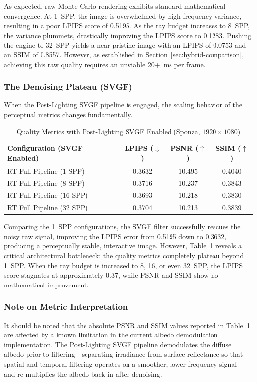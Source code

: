 \documentclass[12pt,a4paper]{report}
\begin{document}
As expected, raw Monte Carlo rendering exhibits standard mathematical convergence. At 1~SPP, the image is overwhelmed by high-frequency variance,
resulting in a poor LPIPS score of 0.5195. As the ray budget increases to 8~SPP, the variance plummets, drastically improving the LPIPS score to 0.1283. Pushing the engine to 32~SPP yields a near-pristine image with an LPIPS of 0.0753 and an SSIM of 0.8557.
However, as established in Section~\ref{sec:hybrid-comparison}, achieving this raw quality requires an unviable 20+~ms per frame.

\subsubsection{The Denoising Plateau (SVGF)}
\label{sec:denoising-plateau}
When the Post-Lighting SVGF pipeline is engaged, the scaling behavior of the perceptual metrics changes fundamentally.

\begin{table}[H]
\centering
\begin{tabular}{|l|c|c|c|}
\hline
\textbf{Configuration (SVGF Enabled)} & \textbf{LPIPS ($\downarrow$)} & \textbf{PSNR ($\uparrow$)} & \textbf{SSIM ($\uparrow$)} \\
\hline
RT Full Pipeline (1 SPP) & 0.3632 & 10.495 & 0.4040 \\
RT Full Pipeline (8 SPP) & 0.3716 & 10.237 & 0.3843 \\
RT Full Pipeline (16 SPP) & 0.3693 & 10.218 & 0.3830 \\
RT Full Pipeline (32 SPP) & 0.3704 & 10.213 & 0.3839 \\
\hline
\end{tabular}
\caption{Quality Metrics with Post-Lighting SVGF Enabled (Sponza, $1920 \times 1080$)}
\label{tab:svgf-metrics}
\end{table}

Comparing the 1~SPP configurations, the SVGF filter successfully rescues the noisy raw signal, improving the LPIPS error from 0.5195 down to 0.3632,
producing a perceptually stable, interactive image. However, Table~\ref{tab:svgf-metrics} reveals a critical architectural bottleneck: the quality metrics completely plateau beyond 1~SPP. When the ray budget is increased to 8, 16, or even 32~SPP,
the LPIPS score stagnates at approximately 0.37, while PSNR and SSIM show no mathematical improvement.

\subsubsection{Note on Metric Interpretation}
\label{sec:metric-interpretation}
It should be noted that the absolute PSNR and SSIM values reported in Table~\ref{tab:svgf-metrics} are affected by a known limitation in the current albedo demodulation implementation.
The Post-Lighting SVGF pipeline demodulates the diffuse albedo prior to filtering---separating irradiance from surface reflectance so that spatial and temporal filtering operates on a smoother,
lower-frequency signal---and re-multiplies the albedo back in after denoising. 
\end{document}
